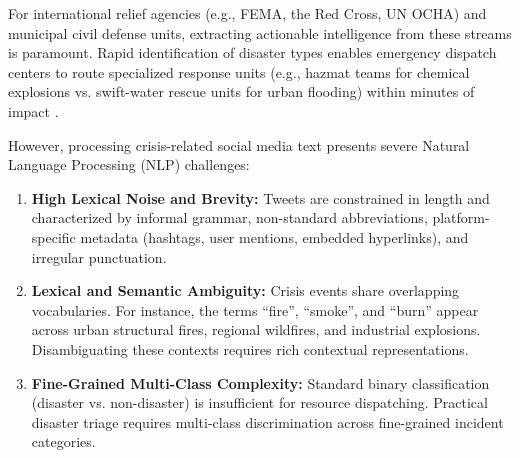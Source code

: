 \documentclass[11pt,a4paper]{article}
\begin{document}
For international relief agencies (e.g., FEMA, the Red Cross, UN OCHA) and municipal civil defense units, extracting actionable intelligence from these streams is paramount. Rapid identification of disaster types enables emergency dispatch centers to route specialized response units (e.g., hazmat teams for chemical explosions vs. swift-water rescue units for urban flooding) within minutes of impact \cite{alam2021crisisbench}.

However, processing crisis-related social media text presents severe Natural Language Processing (NLP) challenges:
\begin{enumerate}
    \item \textbf{High Lexical Noise and Brevity:} Tweets are constrained in length and characterized by informal grammar, non-standard abbreviations, platform-specific metadata (hashtags, user mentions, embedded hyperlinks), and irregular punctuation.
    \item \textbf{Lexical and Semantic Ambiguity:} Crisis events share overlapping vocabularies. For instance, the terms ``fire'', ``smoke'', and ``burn'' appear across urban structural fires, regional wildfires, and industrial explosions. Disambiguating these contexts requires rich contextual representations.
    \item \textbf{Fine-Grained Multi-Class Complexity:} Standard binary classification (disaster vs. non-disaster) is insufficient for resource dispatching. Practical disaster triage requires multi-class discrimination across fine-grained incident categories.
\end{enumerate}
\end{document}
